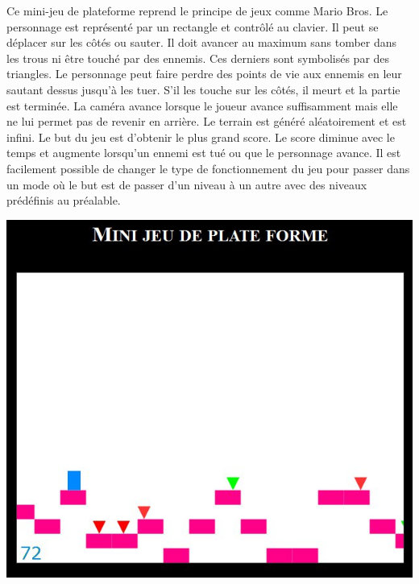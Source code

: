 \begin{minipage}{9cm}
Ce mini-jeu de plateforme reprend le principe de jeux comme Mario Bros.
Le personnage est représenté par un rectangle et contrôlé au clavier. Il peut se déplacer sur les côtés ou sauter.
Il doit avancer au maximum sans tomber dans les trous ni être touché par des ennemis. Ces derniers sont symbolisés par des triangles.
Le personnage peut faire perdre des points de vie aux ennemis en leur sautant dessus jusqu'à les tuer. 
S'il les touche sur les côtés, il meurt et la partie est terminée.
La caméra avance lorsque le joueur avance suffisamment mais elle ne lui permet pas de revenir en arrière.
Le terrain est généré aléatoirement et est infini.
Le but du jeu est d'obtenir le plus grand score. Le score diminue avec le temps et augmente lorsqu'un ennemi est tué ou que le personnage avance.
Il est facilement possible de changer le type de fonctionnement du jeu pour passer dans un mode où le but est de passer d'un niveau à un autre
avec des niveaux prédéfinis au préalable.
\end{minipage}
\hfill
\begin{minipage}{6cm}
 \includegraphics[width=\linewidth]{img/capturejeu_mario}
\end{minipage}


